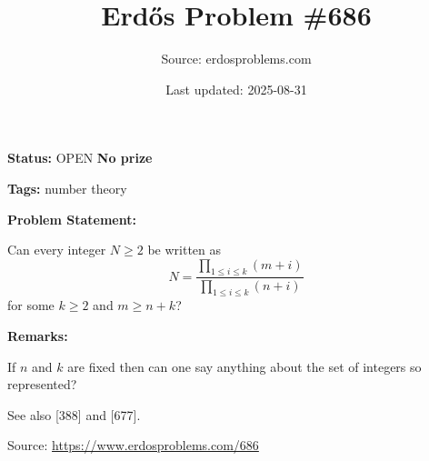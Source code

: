 \documentclass{article}
\title{Erd\H{o}s Problem \#686}
\date{Last updated: 2025-08-31}
\author{Source: erdosproblems.com}
\begin{document}
\maketitle

\noindent\textbf{Status:} OPEN \quad \textbf{No prize}

\noindent\textbf{Tags:} number theory

\medskip
\noindent\textbf{Problem Statement:}

Can every integer $N\geq 2$ be written as\[N=\frac{\prod_{1\leq i\leq k}(m+i)}{\prod_{1\leq i\leq k}(n+i)}\]for some $k\geq 2$ and $m\geq n+k$?

\bigskip
\noindent\textbf{Remarks:}

If $n$ and $k$ are fixed then can one say anything about the set of integers so represented?

See also [388] and [677].

\bigskip
\noindent\small{Source: \url{https://www.erdosproblems.com/686}}
\end{document}
